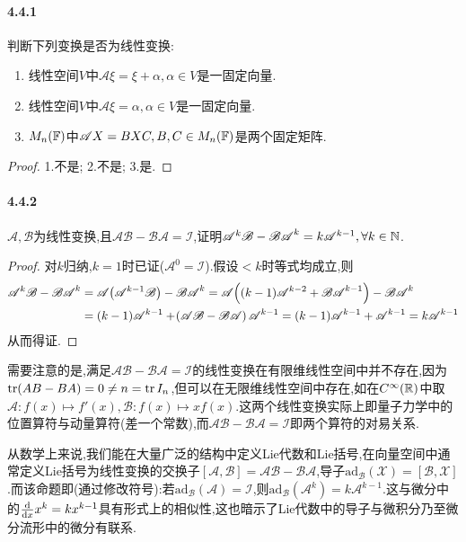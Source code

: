 \documentclass[11pt]{article}
\begin{document}
\paragraph{4.4.1}判断下列变换是否为线性变换:
\begin{enumerate}
    \item 线性空间$V$中$\mathscr{A}\xi=\xi+\alpha, \alpha\in V$是一固定向量.
    \item 线性空间$V$中$\mathscr{A}\xi=\alpha, \alpha\in V$是一固定向量.
    \item $M_n(\mathbb{F})$中$\mathscr{A}X=BXC, B,C\in M_n(\mathbb{F})$是两个固定矩阵.
\end{enumerate}
\begin{proof}
    1.不是; 2.不是; 3.是.
\end{proof}
\paragraph{4.4.2}$\mathscr{A,B}$为线性变换,且$\mathscr{AB-BA=I}$,证明$\mathscr{A}^k\mathscr{B}-\mathscr{BA}^k=k\mathscr{A}^{k-1}, \forall k\in \mathbb{N}$.
\begin{proof}
    对$k$归纳,$k=1$时已证($\mathscr{A}^0=\mathscr{I}$).假设$<k$时等式均成立,则
    $$\begin{aligned}
        \mathscr{A}^k\mathscr{B}-\mathscr{BA}^k&=\mathscr{A}\!\left(\mathscr{A}^{k-1}\mathscr{B}\right)-\mathscr{BA}^k=\mathscr{A}\!\left((k-1)\mathscr{A}^{k-2}+\mathscr{BA}^{k-1}\right)-\mathscr{BA}^k\\
        &=(k-1)\mathscr{A}^{k-1}+\!\left(\mathscr{AB-BA}\right)\mathscr{A}^{k-1}=(k-1)\mathscr{A}^{k-1}+\mathscr{A}^{k-1}=k\mathscr{A}^{k-1}
    \end{aligned}$$
    从而得证.
\end{proof}
\begin{remark}
    需要注意的是,满足$\mathscr{AB-BA=I}$的线性变换在有限维线性空间中并不存在,因为$\operatorname{tr}(AB-BA)=0\neq n=\operatorname{tr} I_n$,但可以在无限维线性空间中存在,如在$C^{\infty}(\mathbb{R})$中取$\mathscr{A}:f(x)\mapsto f'(x), \mathscr{B}:f(x)\mapsto xf(x)$.这两个线性变换实际上即量子力学中的位置算符与动量算符(差一个常数),而$\mathscr{AB-BA=I}$即两个算符的对易关系.
    
    从数学上来说,我们能在大量广泛的结构中定义Lie代数和Lie括号,在向量空间中通常定义Lie括号为线性变换的交换子$[\mathscr{A,B}]=\mathscr{AB-BA}$,导子$\mathrm{ad}_{\mathscr{B}}(\mathscr{X})=[\mathscr{B},\mathscr{X}]$.而该命题即(通过修改符号):若$\mathrm{ad}_{\mathscr{B}}(\mathscr{A})=\mathscr{I}$,则$\mathrm{ad}_{\mathscr{B}}(\mathscr{A}^k)=k\mathscr{A}^{k-1}$.这与微分中的$\frac{\mathrm{d}}{\mathrm{d} x}x^k=kx^{k-1}$具有形式上的相似性,这也暗示了Lie代数中的导子与微积分乃至微分流形中的微分有联系.
\end{remark}
\end{document}
